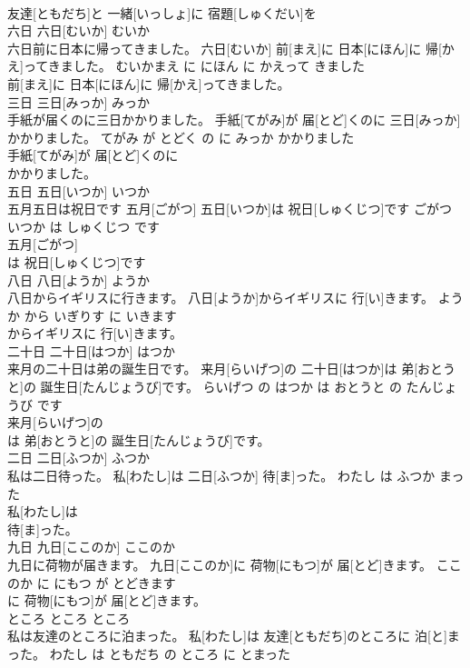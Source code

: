 \documentclass[8pt]{extreport}
\begin{document}
\begin{CJK}{UTF8}{min}
\\	友達[ともだち]と 一緒[いっしょ]に 宿題[しゅくだい]を
\\	六日	六日[むいか]	むいか	
\\	六日前に日本に帰ってきました。	六日[むいか] 前[まえ]に 日本[にほん]に 帰[かえ]ってきました。	むいかまえ に にほん に かえって きました	
\\	前[まえ]に 日本[にほん]に 帰[かえ]ってきました。			
\\	三日	三日[みっか]	みっか	
\\	手紙が届くのに三日かかりました。	手紙[てがみ]が 届[とど]くのに 三日[みっか]かかりました。	てがみ が とどく の に みっか かかりました	
\\	手紙[てがみ]が 届[とど]くのに
\\	かかりました。			
\\	五日	五日[いつか]	いつか	
\\	五月五日は祝日です	五月[ごがつ] 五日[いつか]は 祝日[しゅくじつ]です	ごがつ いつか は しゅくじつ です	
\\	五月[ごがつ]
\\	は 祝日[しゅくじつ]です			
\\	八日	八日[ようか]	ようか	
\\	八日からイギリスに行きます。	八日[ようか]からイギリスに 行[い]きます。	ようか から いぎりす に いきます	
\\	からイギリスに 行[い]きます。			
\\	二十日	二十日[はつか]	はつか	
\\	来月の二十日は弟の誕生日です。	来月[らいげつ]の 二十日[はつか]は 弟[おとうと]の 誕生日[たんじょうび]です。	らいげつ の はつか は おとうと の たんじょうび です	
\\	来月[らいげつ]の
\\	は 弟[おとうと]の 誕生日[たんじょうび]です。			
\\	二日	二日[ふつか]	ふつか	
\\	私は二日待った。	私[わたし]は 二日[ふつか] 待[ま]った。	わたし は ふつか まった	
\\	私[わたし]は
\\	待[ま]った。			
\\	九日	九日[ここのか]	ここのか	
\\	九日に荷物が届きます。	九日[ここのか]に 荷物[にもつ]が 届[とど]きます。	ここのか に にもつ が とどきます	
\\	に 荷物[にもつ]が 届[とど]きます。			
\\	ところ	ところ	ところ	
\\	私は友達のところに泊まった。	私[わたし]は 友達[ともだち]のところに 泊[と]まった。	わたし は ともだち の ところ に とまった	

\end{CJK}
\end{document}
